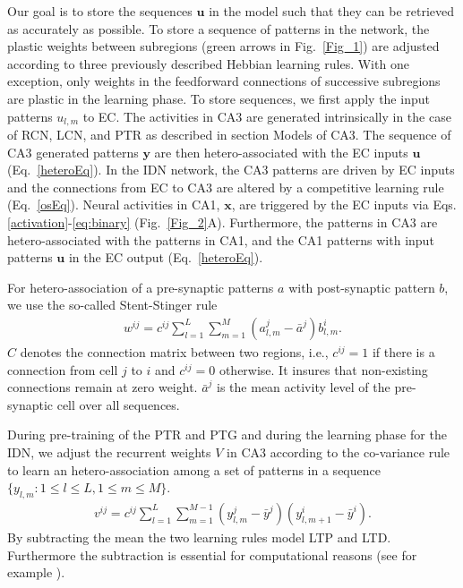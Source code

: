 \documentclass[utf8]{frontiersSCNS} %
\begin{document}
Our goal is to store the sequences $\mathbf u$ in the model such that they can be retrieved as accurately as possible. To store a sequence of patterns in the network, the plastic weights between subregions (green arrows in Fig.~\ref{Fig_1}) are adjusted according to three previously described Hebbian learning rules. With one exception, only weights in the feedforward connections of successive subregions are plastic in the learning phase. To store sequences, we first apply the input patterns $u_{l,m}$ to EC. The activities in CA3 are generated intrinsically in the case of RCN, LCN, and PTR as described in section Models of CA3. The sequence of CA3 generated patterns $\mathbf y$ are then hetero-associated with the EC inputs $\mathbf u$ (Eq.~\ref{heteroEq}). 
%
In the IDN network, the CA3 patterns are driven by EC inputs and the connections from EC to CA3 are altered by a competitive learning rule (Eq.~\ref{osEq}).
%
Neural activities in CA1, $\mathbf x$, are triggered by the EC inputs via Eqs. \ref{activation}-\ref{eq:binary} (Fig.~\ref{Fig_2}A). Furthermore, the patterns in CA3 are hetero-associated with the patterns in CA1, and the CA1 patterns with input patterns $\mathbf u$ in the EC output (Eq.~\ref{heteroEq}). 

For hetero-association of a pre-synaptic patterns $a$ with post-synaptic pattern $b$, we use the so-called Stent-Stinger rule \cite{stent1973physiological}
%
\begin{align}
	\label{heteroEq}
	w^{ij} = c^{ij}\sum_{l=1}^L{\sum_{m=1}^M(a^j_{l, m}  - \bar {a}^j)b_{l, m}^i}.
\end{align}
$C$ denotes the connection matrix between two regions, i.e., $c^{ij} = 1$ if there is a connection from cell $j$ to $i$ and $c^{ij} = 0$ otherwise. It insures that non-existing connections remain at zero weight. $\bar{a}^j$ is the mean activity level of the pre-synaptic cell over all sequences. 

During pre-training of the PTR and PTG and during the learning phase for the IDN, we adjust the recurrent weights $V$ in CA3 according to the co-variance rule \cite{sejnowski1977storing} to learn an hetero-association among a set of patterns in a sequence $\{ y_{l, m}: 1\le l \le L, 1\le m \le M\}$.
\begin{align}
	\label{heteroca3Eq}
	v^{ij} =  c^{ij}\sum_{l=1}^L{\sum_{m=1}^{M-1}(y^j_{l, m}  - \bar {y}^j)(y_{l, m+1}^i - \bar{y}^i)}.
\end{align}
By subtracting the mean the two learning rules model LTP and LTD. Furthermore the subtraction is essential for computational reasons (see for example \cite[chapter 8.2]{amit1992modeling}).
\end{document}
